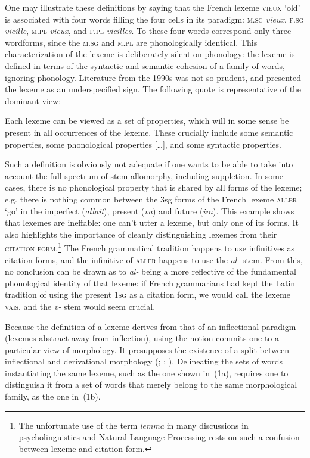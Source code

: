 \documentclass[output=paper]{langsci/langscibook}
\begin{document}
One may illustrate these definitions by saying that the French lexeme
\textsc{vieux} `old' is associated with four words filling the four
cells in its paradigm: \textsc{m.sg} \emph{vieux}, \textsc{f.sg} \emph{vieille}, \textsc{m.pl}
\emph{vieux}, and \textsc{f.pl} \emph{vieilles}. To these four words correspond
only three wordforms, since the \textsc{m.sg} and \textsc{m.pl} are phonologically
identical. This characterization of the lexeme is deliberately silent on
phonology: the lexeme is defined in terms of the syntactic and semantic
cohesion of a family of words, ignoring phonology. Literature from the
1990s was not so prudent, and presented the lexeme as an underspecified
sign. The following quote is representative of the dominant view:

\begin{modquote}
Each lexeme can be viewed as a set of properties, which will in some
sense be present in all occurrences of the lexeme. These crucially
include some semantic properties, some phonological properties
{[}\ldots{}{]}, and some syntactic properties. \citep[333]{Zwicky92}
\end{modquote}

Such a definition is obviously not adequate if one wants to be able to
take into account the full spectrum of stem allomorphy, including
suppletion. In some cases, there is no phonological property that is
shared by all forms of the lexeme; e.g. there is nothing common between
the 3sg forms of the French lexeme \textsc{aller} `go' in the imperfect
(\emph{allait}), present (\emph{va}) and future (\emph{ira}). This
example shows that lexemes are ineffable: one can't utter a lexeme, but
only one of its forms. It also highlights the importance of cleanly
distinguishing lexemes from their \textsc{citation form.}\footnote{The
  unfortunate use of the term \emph{lemma} in many discussions in
  psycholinguistics and Natural Language Processing rests on such a
  confusion between lexeme and citation form.} The French grammatical
tradition happens to use infinitives as citation forms, and the
infinitive of \textsc{aller} happens to use the \emph{al-} stem. From
this, no conclusion can be drawn as to \emph{al-} being a more
reflective of the fundamental phonological identity of that lexeme: if
French grammarians had kept the Latin tradition of using the present
\textsc{1sg} as a citation form, we would call the lexeme \textsc{vais},
and the \emph{v-} stem would seem crucial.

Because the definition of a lexeme derives from that of an inflectional
paradigm (lexemes abstract away from inflection), using the notion
commits one to a particular view of morphology. It presupposes the
existence of a split between inflectional and derivational morphology
(\citealt[140, note 4]{Matthews65}; \citealt{Anderson82}; \citealt{Perlmutter88}).
Delineating the sets of words instantiating the same lexeme, such as the
one shown in~(1a), requires one to distinguish it from a set of words
that merely belong to the same morphological family, as the one in~(1b).
\end{document}
